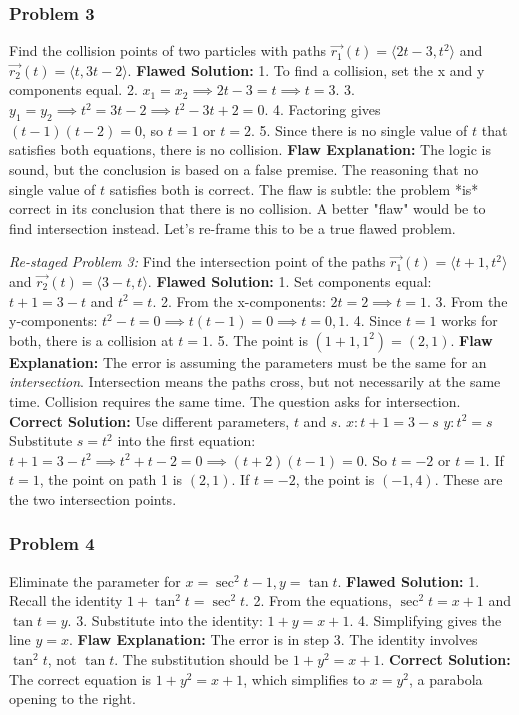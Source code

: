 \documentclass{article}
\begin{document}
\subsubsection{Problem 3}
Find the collision points of two particles with paths \( \vec{r_1}(t) = \langle 2t-3, t^2 \rangle \) and \( \vec{r_2}(t) = \langle t, 3t-2 \rangle \).
\textbf{Flawed Solution:}
1. To find a collision, set the x and y components equal.
2. \( x_1 = x_2 \implies 2t - 3 = t \implies t = 3 \).
3. \( y_1 = y_2 \implies t^2 = 3t - 2 \implies t^2 - 3t + 2 = 0 \).
4. Factoring gives \( (t-1)(t-2) = 0 \), so \( t=1 \) or \( t=2 \).
5. Since there is no single value of \(t\) that satisfies both equations, there is no collision.
\newline
\textbf{Flaw Explanation:}
The logic is sound, but the conclusion is based on a false premise. The reasoning that no single value of \(t\) satisfies both is correct. The flaw is subtle: the problem *is* correct in its conclusion that there is no collision. A better "flaw" would be to find intersection instead. Let's re-frame this to be a true flawed problem.

\textit{Re-staged Problem 3:} Find the intersection point of the paths \( \vec{r_1}(t) = \langle t+1, t^2 \rangle \) and \( \vec{r_2}(t) = \langle 3-t, t \rangle \).
\textbf{Flawed Solution:}
1. Set components equal: \( t+1 = 3-t \) and \( t^2 = t \).
2. From the x-components: \( 2t = 2 \implies t=1 \).
3. From the y-components: \( t^2-t = 0 \implies t(t-1)=0 \implies t=0, 1 \).
4. Since \(t=1\) works for both, there is a collision at \(t=1\).
5. The point is \((1+1, 1^2) = (2,1)\).
\newline
\textbf{Flaw Explanation:}
The error is assuming the parameters must be the same for an \textit{intersection}. Intersection means the paths cross, but not necessarily at the same time. Collision requires the same time. The question asks for intersection.
\textbf{Correct Solution:} Use different parameters, \(t\) and \(s\).
\(x: t+1 = 3-s\)
\(y: t^2 = s\)
Substitute \(s=t^2\) into the first equation: \( t+1 = 3-t^2 \implies t^2+t-2=0 \implies (t+2)(t-1)=0\). So \(t=-2\) or \(t=1\).
If \(t=1\), the point on path 1 is \((2,1)\). If \(t=-2\), the point is \((-1,4)\). These are the two intersection points.

\subsubsection{Problem 4}
Eliminate the parameter for \( x = \sec^2 t - 1, y = \tan t \).
\textbf{Flawed Solution:}
1. Recall the identity \( 1 + \tan^2 t = \sec^2 t \).
2. From the equations, \( \sec^2 t = x+1 \) and \( \tan t = y \).
3. Substitute into the identity: \( 1 + y = x+1 \).
4. Simplifying gives the line \( y = x \).
\newline
\textbf{Flaw Explanation:}
The error is in step 3. The identity involves \(\tan^2 t\), not \(\tan t\). The substitution should be \(1 + y^2 = x+1\).
\textbf{Correct Solution:} The correct equation is \( 1+y^2 = x+1 \), which simplifies to \( x = y^2 \), a parabola opening to the right.
\end{document}

